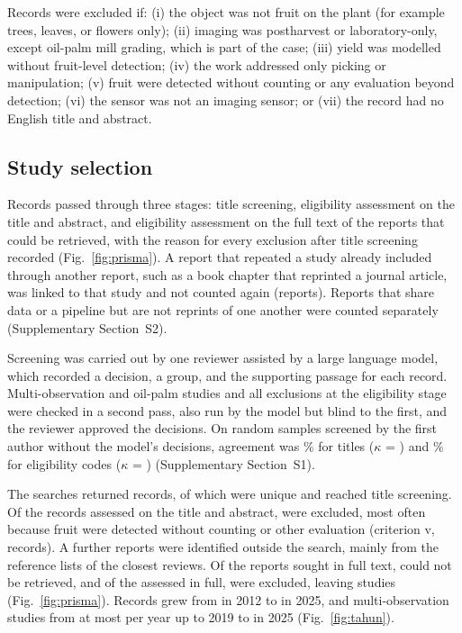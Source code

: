 Records were excluded if: (i) the object was not fruit on the plant (for example trees, leaves, or flowers only); (ii) imaging was postharvest or laboratory-only, except oil-palm mill grading, which is part of the case; (iii) yield was modelled without fruit-level detection; (iv) the work addressed only picking or manipulation; (v) fruit were detected without counting or any evaluation beyond detection; (vi) the sensor was not an imaging sensor; or (vii) the record had no English title and abstract.

\subsection{Study selection}\label{sec:screening}
Records passed through three stages: title screening, eligibility assessment on the title and abstract, and eligibility assessment on the full text of the reports that could be retrieved, with the reason for every exclusion after title screening recorded (Fig.~\ref{fig:prisma}). A report that repeated a study already included through another report, such as a book chapter that reprinted a journal article, was linked to that study and not counted again (\nFTExclEight reports). Reports that share data or a pipeline but are not reprints of one another were counted separately (Supplementary Section~S2).

Screening was carried out by one reviewer assisted by a large language model, which recorded a decision, a group, and the supporting passage for each record. Multi-observation and oil-palm studies and all exclusions at the eligibility stage were checked in a second pass, also run by the model but blind to the first, and the reviewer approved the decisions. On random samples screened by the first author without the model's decisions, agreement was \pHumTitles\% for titles ($\kappa$ = \kHumTitles) and \pHumElig\% for eligibility codes ($\kappa$ = \kHumElig) (Supplementary Section~S1).

The searches returned \nRetrieved records, of which \nUnique were unique and \nTitles reached title screening. Of the \nAssessed records assessed on the title and abstract, \nEligExcl were excluded, most often because fruit were detected without counting or other evaluation (criterion v, \nExclFive records). A further \nOther reports were identified outside the search, mainly from the reference lists of the closest reviews. Of the \nSought reports sought in full text, \nNotRetrieved could not be retrieved, and of the \nFTAssessed assessed in full, \nFTExcl were excluded, leaving \nIncluded studies (Fig.~\ref{fig:prisma}). Records grew from \nYearFirst in 2012 to \nYearPeak in 2025, and multi-observation studies from at most \nMultiEarlyMax per year up to 2019 to \nMultiPeak in 2025 (Fig.~\ref{fig:tahun}).

